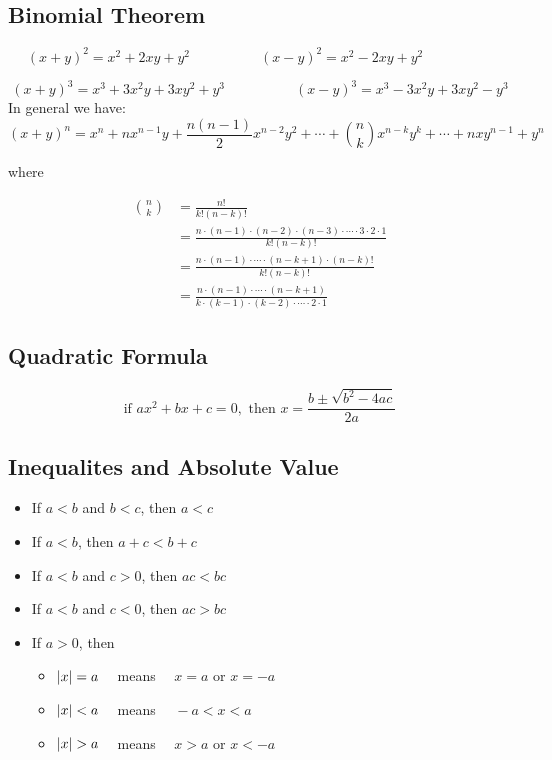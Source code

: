 \subsection{Binomial Theorem}

\[
  (x + y)^2 = x^2 + 2xy + y^2 \hspace{5em}
  (x - y)^2 = x^2 - 2xy + y^2 \hspace{5em}
\]

\[
  (x + y)^3 = x^3 + 3x^2y + 3xy^2 + y^3 \hspace{5em}
  (x - y)^3 = x^3 - 3x^2y + 3xy^2 - y^3 
\]
In general we have:
\[
  (x + y)^n = x^n + nx^{n-1}y + \frac{n(n-1)}2 x^{n-2}y^2 + \cdots + \binom nk x^{n-k}y^k + \cdots + nxy^{n-1} + y^n
\]

where

\begin{align*}
  \binom nk &= \frac{n!}{k! (n - k)!} \\
            &= \frac{n \cdot (n-1) \cdot (n-2) \cdot (n-3) \cdot \cdots \cdot 3 \cdot 2 \cdot 1}{k!(n - k)!}\\
            &= \frac{n \cdot (n-1) \cdot \cdots \cdot (n - k + 1) \cdot (n-k)!}{k!(n - k)!}\\
            &= \frac{n \cdot (n-1) \cdot \cdots \cdot (n - k + 1)}{k \cdot (k-1) \cdot (k-2) \cdot \cdots \cdot 2 \cdot 1}
\end{align*}

\subsection{Quadratic Formula}
\[
  \text{if } ax^2 + bx + c = 0, \text{ then } x = \frac{b \pm \sqrt{b^2 - 4ac}}{2a}
\]

\subsection{Inequalites and Absolute Value}
\begin{itemize}
  \item If $a < b$ and $b < c$, then $a < c$
  \item If $a < b$, then $a + c < b + c$
  \item If $a < b$ and $c > 0$, then $ac < bc$
  \item If $a < b$ and $c < 0$, then $ac > bc$
  \item If $a > 0$, then
    \begin{itemize}
      \item $\abs*{x} = a \quad$ means $\quad x = a$ or $x = -a$
      \item $\abs*{x} < a \quad$ means $\quad -a < x < a$
      \item $\abs*{x} > a \quad$ means $\quad x > a$ or $x < -a$
    \end{itemize}
\end{itemize}

